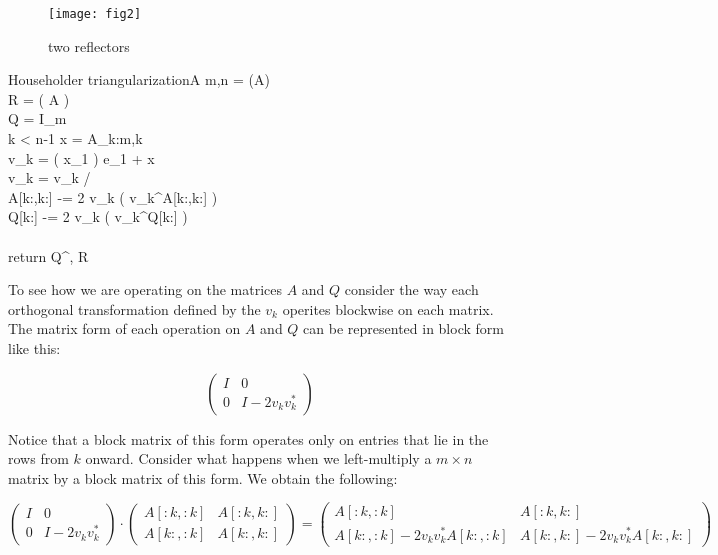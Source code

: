 \begin{figure}
	\centering
	\texttt{[image: fig2]}
	\caption{two reflectors}
	\label{fig:two reflectors}
\end{figure}

\begin{pseudo}{Householder triangularization}{A}
\label{Alg:Householder triangularization}
m,n = (A)\\
R =  \left( A \right) \\
Q = I_m \\
 \leq k < n-1
\DO
\BEGIN
   x = A_{k:m,k}\\
   v_k =  \left( x_1 \right)  e_1 + x \\
   v_k = v_k /  \\
   A[k:,k:] -= 2 v_k \left( v_k^\ast A[k:,k:] \right) \\
   Q[k:] -= 2 v_k \left( v_k^\ast Q[k:] \right) \\
\END \\
return Q^\ast , R
\end{pseudo}

To see how we are operating on the matrices $A$ and $Q$ consider the way each orthogonal transformation defined by the $v_k$ operites blockwise on each matrix.
The matrix form of each operation on $A$ and $Q$ can be represented in block form like this:

\[
\begin{pmatrix}
I & 0 \\
0 & I - 2 v_k v_k^\ast
\end{pmatrix}
\]

Notice that a block matrix of this form operates only on entries that lie in the rows from $k$ onward.
Consider what happens when we left-multiply a $m \times n$ matrix by a block matrix of this form.
We obtain the following:

\[
\begin{pmatrix}
I & 0 \\
0 & I - 2 v_k v_k^\ast
\end{pmatrix}
\cdot
\begin{pmatrix}
A[:k,:k] & A[:k,k:] \\
A[k:,:k] & A[k:,k:]
\end{pmatrix}
=
\begin{pmatrix}
A[:k,:k] & A[:k,k:] \\
A[k:,:k] - 2 v_k v_k^\ast A[k:,:k] & A[k:,k:] - 2 v_k v_k^\ast A[k:,k:]
\end{pmatrix}
\]

